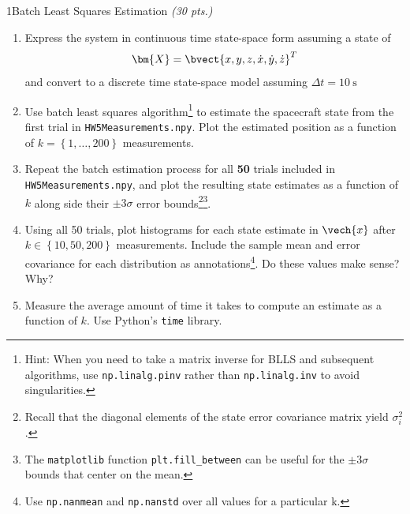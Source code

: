 \begin{hwkProblem}{1}{Batch Least Squares Estimation \textit{(30 pts.)}}
	\begin{enumerate}[label=\alph*.]
		\item \label{hwk:p01a} Express the system in continuous time state-space form assuming a state of
			\[
				\bm{X} = \bvect{x, y, z, \dot{x}, \dot{y}, \dot{z}}^{T}
			\]
			and convert to a discrete time state-space model assuming \( \Delta t = \qty{10}{\s} \)
		\item \label{hwk:p01b} Use batch least squares algorithm\footnote{Hint: When you need to take a matrix inverse for BLLS and subsequent algorithms, use \texttt{np.linalg.pinv} rather than \texttt{np.linalg.inv} to avoid singularities.} to estimate the spacecraft state from the first trial in \texttt{HW5Measurements.npy}. Plot the estimated position as a function of \( k = \left\{ 1, \dots, 200 \right\} \) measurements.
		\item \label{hwk:p01c} Repeat the batch estimation process for all \textbf{50} trials included in \texttt{HW5Measurements.npy}, and plot the resulting state estimates as a function of \( k \) along side their \( \pm 3 \sigma \) error bounds\footnote{Recall that the diagonal elements of the state error covariance matrix yield \( \sigma_{i}^{2} \).}\footnote{The \texttt{matplotlib} function \texttt{plt.fill_between} can be useful for the \( \pm 3 \sigma \) bounds that center on the mean.}.
		\item \label{hwk:p01d} Using all 50 trials, plot histograms for each state estimate in \( \vech{x} \) after \( k \in \left\{ 10, 50, 200 \right\} \) measurements. Include the sample mean and error covariance for each distribution as annotations\footnote{Use \texttt{np.nanmean} and \texttt{np.nanstd} over all values for a particular k.}. Do these values make sense? Why?
		\item \label{hwk:p01e} Measure the average amount of time it takes to compute an estimate as a function of \( k \). Use Python's \texttt{time} library.
	\end{enumerate}

	\hwkSol{} \label{hwk:s01}

	\hwkPart{} \label{hwk:s01a}


\end{hwkProblem}
